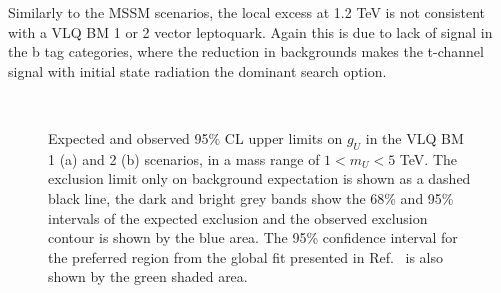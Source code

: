 Similarly to the MSSM scenarios, the local excess at 1.2 TeV is not consistent with a VLQ BM 1 or 2 vector leptoquark.
Again this is due to lack of signal in the b tag categories, where the reduction in backgrounds makes the t-channel signal with initial state radiation the dominant search option.

\begin{figure}[!hbtp]
\centering
     \\
\caption{Expected and observed 95\% CL upper limits on $g_U$ in the VLQ BM 1 (a) and 2 (b) scenarios, in a mass range of $1<m_{U}<5$ TeV.  The exclusion limit only on background expectation is shown as a dashed black line, the dark and bright grey bands show the 68\% and 95\% intervals of the expected exclusion and the observed exclusion contour is shown by the blue area. The 95\% confidence interval for the preferred region from the global fit presented in Ref.~\cite{Cornella:2021sby} is also shown by the green shaded area.
}
\label{fig:vlq_limits}
\end{figure}

